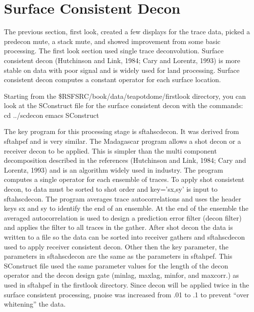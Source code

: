 

\section{Surface Consistent Decon}
The previous section, first look, created a few displays for the trace data, picked a predecon mute, a stack mute, and showed improvement from some basic processing.  The first look section used single trace deconvolution.  Surface consistent decon (Hutchinson and Link, 1984; Cary and Lorentz, 1993) is more stable on data with poor signal and is widely used for land processing.  Surface consistent decon computes a constant operator for each surface location.  

Starting from the \$RSFSRC/book/data/teapotdome/firstlook directory, you can look at the SConstruct file for the surface consistent decon with the commands:
cd ../scdecon
emacs SConstruct

The key program for this processing stage is sftahscdecon.  It was derived from sftahpef and is very similar.  The Madagascar program allows a shot decon or a receiver decon to be applied.  This is simpler than the multi component decomposition described in the references  (Hutchinson and Link, 1984; Cary and Lorentz, 1993) and is an algorithm widely used in industry.  The program computes a single operator for each ensemble of traces.  To apply shot consistent decon, to data must be sorted to shot order and key=’sx,sy' is input to sftahscdecon.  The program averages trace autocorrelations and uses the header keys sx and sy to identify the end of an ensemble.  At the end of the ensemble the averaged autocorrelation is used to design a prediction error filter (decon filter) and applies the filter to all traces in the gather.  After shot decon the data is written to a file so the data can be sorted into receiver gathers and sftahscdecon used to apply receiver consistent decon.  Other then the key parameter, the parameters in sftahscdecon are the same as the parameters in sftahpef.  This SConstruct file used the same parameter values for the length of the decon operator and the decon design gate (minlag, maxlag, minfor, and maxcorr.) as used in sftahpef in the firstlook directory.  Since decon will be applied twice in the surface consistent processing, pnoise was increased from .01 to .1 to prevent “over whitening”  the data.

